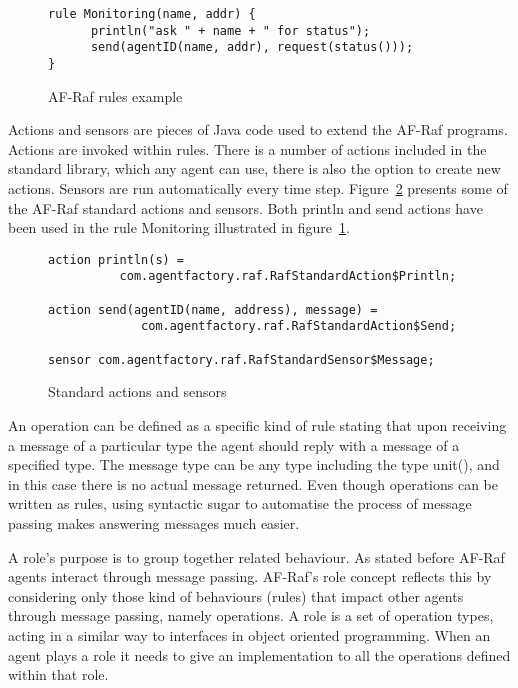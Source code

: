 \documentclass[a4paper,12pt,oneside,fleqn]{book} %
\begin{document}


\begin{figure}\footnotesize %
\begin{verbatim}
rule Monitoring(name, addr) {
      println("ask " + name + " for status");
      send(agentID(name, addr), request(status()));
}
\end{verbatim}
\caption{AF-Raf rules example}
\label{fig:rule}
\end{figure} %

Actions and sensors are pieces of Java code used to extend the AF-Raf
programs. Actions are invoked within rules. There is a number of actions
included in the standard library, which any agent can use, there is also
the option to create new actions. Sensors are run automatically every time
step. Figure~\ref{fig:actions-sensors} presents some of the AF-Raf standard
actions and sensors. Both println and send actions have been used in the
rule Monitoring illustrated in figure~\ref{fig:rule}.


\begin{figure}\footnotesize %
\begin{verbatim}
action println(s) =
          com.agentfactory.raf.RafStandardAction$Println;

action send(agentID(name, address), message) =
             com.agentfactory.raf.RafStandardAction$Send;

sensor com.agentfactory.raf.RafStandardSensor$Message;
\end{verbatim}
\caption{Standard actions and sensors}
\label{fig:actions-sensors}
\end{figure} %


An operation can be defined as a specific kind of rule stating that upon
receiving a message of a particular type the agent should reply with a
message of a specified type. The message type can be any type including the
type unit(), and in this case there is no actual message returned. Even
though operations can be written as rules, using syntactic sugar to
automatise the process of message passing makes answering messages much
easier.

A role's purpose is to group together related behaviour. As stated before
AF-Raf agents interact through message passing. AF-Raf's role concept
reflects this by considering only those kind of behaviours (rules) that
impact other agents through message passing, namely operations. A role is a
set of operation types, acting in a similar way to interfaces in object
oriented programming. When an agent plays a role it needs to give an
implementation to all the operations defined within that role.
\end{document}

